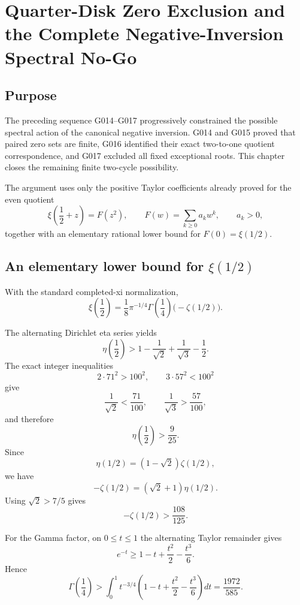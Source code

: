 \chapter{Quarter-Disk Zero Exclusion and the Complete Negative-Inversion Spectral No-Go}
\label{chap:quarter-disk-zero-exclusion}


\section{Purpose}

The preceding sequence G014--G017 progressively constrained the possible spectral action of the canonical negative inversion. G014 and G015 proved that paired zero sets are finite, G016 identified their exact two-to-one quotient correspondence, and G017 excluded all fixed exceptional roots. This chapter closes the remaining finite two-cycle possibility.

The argument uses only the positive Taylor coefficients already proved for the even quotient
\[
 \xi\!\left(\frac12+z\right)=F(z^2),
 \qquad F(w)=\sum_{k\ge0}a_k w^k,
 \qquad a_k>0,
\]
together with an elementary rational lower bound for $F(0)=\xi(1/2)$.

\section{An elementary lower bound for $\xi(1/2)$}

With the standard completed-xi normalization,
\[
 \xi\!\left(\frac12\right)
 =\frac18\pi^{-1/4}\Gamma\!\left(\frac14\right)
 \bigl(-\zeta(1/2)\bigr).
\]

The alternating Dirichlet eta series yields
\[
 \eta\!\left(\frac12\right)
 >1-\frac1{\sqrt2}+\frac1{\sqrt3}-\frac12.
\]
The exact integer inequalities
\[
 2\cdot71^2>100^2,
 \qquad
 3\cdot57^2<100^2
\]
give
\[
 \frac1{\sqrt2}<\frac{71}{100},
 \qquad
 \frac1{\sqrt3}>\frac{57}{100},
\]
and therefore
\[
 \eta\!\left(\frac12\right)>\frac9{25}.
\]
Since
\[
 \eta(1/2)=(1-\sqrt2)\zeta(1/2),
\]
we have
\[
 -\zeta(1/2)=(\sqrt2+1)\eta(1/2).
\]
Using $\sqrt2>7/5$ gives
\[
 -\zeta(1/2)>\frac{108}{125}.
\]

For the Gamma factor, on $0\le t\le1$ the alternating Taylor remainder gives
\[
 e^{-t}\ge1-t+\frac{t^2}{2}-\frac{t^3}{6}.
\]
Hence
\[
 \Gamma\!\left(\frac14\right)
 >\int_0^1 t^{-3/4}
 \left(1-t+\frac{t^2}{2}-\frac{t^3}{6}\right)dt
 =\frac{1972}{585}.
\]

